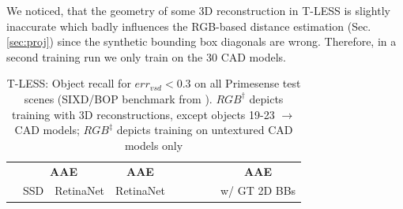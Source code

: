 We noticed, that the geometry of some 3D reconstruction in T-LESS is slightly inaccurate which badly influences the RGB-based distance estimation (Sec. \ref{sec:proj}) since the synthetic bounding box diagonals are wrong. Therefore, in a second training run we only train on the 30 CAD models.

{\setlength{\tabcolsep}{0.2em}
	\begin{table}[t]
	\scriptsize
	\centering
	\captionsetup{justification=centering}
	\caption{T-LESS: Object recall for $err_{vsd}<0.3$ on all Primesense test scenes (SIXD/BOP benchmark from \cite{hodan2018bop}). $RGB^\dag$ depicts training with 3D reconstructions, except objects 19-23 $\longrightarrow$ CAD models; $RGB^\ddag$ depicts training on untextured CAD models only }
	\begin{adjustbox}{max width=\textwidth}
		\begin{tabular}{r|ccc|ccccc|cc}
			\toprule
			& \multicolumn{3}{c|}{\textbf{AAE}} &\textbf{AAE}& &&&  & \multicolumn{2}{|c}{\textbf{AAE}}\\
			
			& SSD& \multicolumn{2}{|c|}{RetinaNet}& RetinaNet & \citeauthor{brachmann2016uncertainty}&  \citeauthor{kehl2016deep} & \citeauthor{vidal20186d} & \citeauthor{drost2010model} & \multicolumn{2}{|c}{w/ GT 2D BBs}\\
			

\end{tabular}
\end{adjustbox}
\end{table}}
